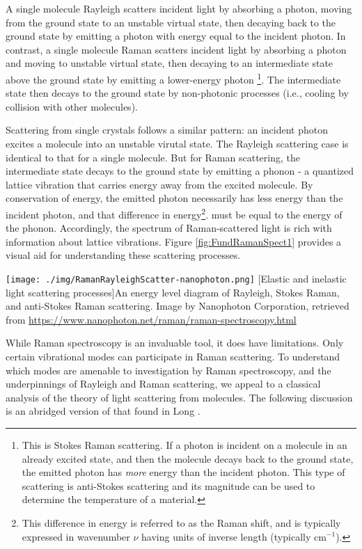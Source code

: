 A single molecule Rayleigh scatters incident light by absorbing a photon, moving from the ground state to an unstable virtual state, then decaying back to the ground state by emitting a photon with energy equal to the incident photon. In contrast, a single molecule Raman scatters incident light by absorbing a photon and moving to unstable virtual state, then decaying to an intermediate state above the ground state by emitting a lower-energy photon \footnote{This is Stokes Raman scattering. If a photon is incident on a molecule in an already excited state, and then the molecule decays back to the ground state, the emitted photon has \textit{more} energy than the incident photon. This type of scattering is anti-Stokes scattering and its magnitude can be used to determine the temperature of a material.}. The intermediate state then decays to the ground state by non-photonic processes (i.e., cooling by collision with other molecules).

Scattering from single crystals follows a similar pattern: an incident photon excites a molecule into an unstable virutal state. The Rayleigh scattering case is identical to that for a single molecule. But for Raman scattering, the intermediate state decays to the ground state by emitting a phonon - a quantized lattice vibration that carries energy away from the excited molecule. By conservation of energy, the emitted photon necessarily has less energy than the incident photon, and that difference in energy\footnote{This difference in energy is referred to as the Raman shift, and is typically expressed in wavenumber $\nu$ having units of inverse length (typically cm$^{-1}$).}. must be equal to the energy of the phonon. Accordingly, the spectrum of Raman-scattered light is rich with information about lattice vibrations. Figure \ref{fig:FundRamanSpect1} provides a visual aid for understanding these scattering processes.

\begin{centering}
\texttt{[image: ./img/RamanRayleighScatter-nanophoton.png]}
  \captionsetup{width=0.75\textwidth}
  [Elastic and inelastic light scattering processes]{An energy level diagram of Rayleigh, Stokes Raman, and anti-Stokes Raman scattering. Image by Nanophoton Corporation, retrieved from \url{https://www.nanophoton.net/raman/raman-spectroscopy.html}}
  \label{fig:FundRamanSpect1}
\end{centering}

While Raman spectroscopy is an invaluable tool, it does have limitations. Only certain vibrational modes can participate in Raman scattering. To understand which modes are amenable to investigation by Raman spectroscopy, and the underpinnings of Rayleigh and Raman scattering, we appeal to a classical analysis of the theory of light scattering from molecules. The following discussion is an abridged version of that found in Long \cite{Long2002}.

